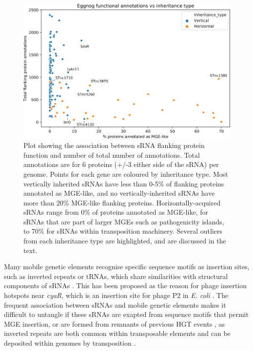 \begin{figure}[H]
    \centering
        \includegraphics{sal/function_vs_inheritance_2.png}
    \caption[Association between flanking protein function and conservation]{Plot showing the association between sRNA flanking protein function and number of total number of annotations. Total annotations are for 6 proteins (+/-3 either side of the sRNA) per genome. Points for each gene are coloured by inheritance type. Most vertically inherited sRNAs have less than 0-5\% of flanking proteins annotated as MGE-like, and no vertically-inherited sRNAs have more than 20\% MGE-like flanking proteins. Horizontally-acquired sRNAs range from 0\% of proteins annotated as MGE-like, for sRNAs that are part of larger MGEs such as pathogenicity islands, to 70\% for sRNAs within transposition machinery. Several outliers from each inheritance type are highlighted, and are discussed in the text.}
    \label{fig:function_vs_inheritance}
\end{figure}


Many mobile genetic elements recognise specific sequence motifs as insertion sites, such as inverted repeats or tRNAs, which share similarities with structural components of sRNAs \citep{Darmon2014-dxjx, Siguier2014-jm,Williams2002-kj}. This has been proposed as the reason for phage insertion hotspots near \textit{cyaR}, which is an insertion site for phage P2 in \textit{E. coli} \citep{De_Lay2009-ye}. The frequent association between sRNAs and mobile genetic elements makes it difficult to untangle if these sRNAs are exapted from sequence motifs that permit MGE insertion, or are formed from remnants of previous HGT events \citep{Jose2019-wi}, as inverted repeats are both common within transposable elements and can be deposited within genomes by transposition \citep{Delihas2011-ra,Vandecraen2017-dh,Siguier2014-jm}.  

